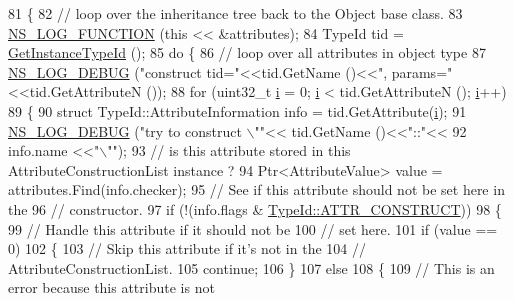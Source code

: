 \begin{DoxyCode}
81 \{
82   \textcolor{comment}{// loop over the inheritance tree back to the Object base class.}
83   \hyperlink{log-macros-disabled_8h_a90b90d5bad1f39cb1b64923ea94c0761}{NS\_LOG\_FUNCTION} (\textcolor{keyword}{this} << &attributes);
84   TypeId tid = \hyperlink{classns3_1_1ObjectBase_abe5b43a6f5b99a92a4c3122db31f06fb}{GetInstanceTypeId} ();
85   \textcolor{keywordflow}{do} \{
86       \textcolor{comment}{// loop over all attributes in object type}
87       \hyperlink{group__logging_ga413f1886406d49f59a6a0a89b77b4d0a}{NS\_LOG\_DEBUG} (\textcolor{stringliteral}{"construct tid="}<<tid.GetName ()<<\textcolor{stringliteral}{", params="}<<tid.GetAttributeN ());
88       \textcolor{keywordflow}{for} (uint32\_t \hyperlink{bernuolliDistribution_8m_a6f6ccfcf58b31cb6412107d9d5281426}{i} = 0; \hyperlink{bernuolliDistribution_8m_a6f6ccfcf58b31cb6412107d9d5281426}{i} < tid.GetAttributeN (); \hyperlink{bernuolliDistribution_8m_a6f6ccfcf58b31cb6412107d9d5281426}{i}++)
89         \{
90           \textcolor{keyword}{struct }TypeId::AttributeInformation info = tid.GetAttribute(\hyperlink{bernuolliDistribution_8m_a6f6ccfcf58b31cb6412107d9d5281426}{i});
91           \hyperlink{group__logging_ga413f1886406d49f59a6a0a89b77b4d0a}{NS\_LOG\_DEBUG} (\textcolor{stringliteral}{"try to construct \(\backslash\)""}<< tid.GetName ()<<\textcolor{stringliteral}{"::"}<<
92                         info.name <<\textcolor{stringliteral}{"\(\backslash\)""});
93           \textcolor{comment}{// is this attribute stored in this AttributeConstructionList instance ?}
94           Ptr<AttributeValue> value = attributes.Find(info.checker);
95           \textcolor{comment}{// See if this attribute should not be set here in the}
96           \textcolor{comment}{// constructor.}
97           \textcolor{keywordflow}{if} (!(info.flags & \hyperlink{classns3_1_1TypeId_a3ab7b43b95f96391c514d609ca60e542aa8dc1d5d889cc9489244c94ede243d62}{TypeId::ATTR\_CONSTRUCT}))
98             \{
99               \textcolor{comment}{// Handle this attribute if it should not be }
100               \textcolor{comment}{// set here.}
101               \textcolor{keywordflow}{if} (value == 0)
102                 \{
103                   \textcolor{comment}{// Skip this attribute if it's not in the}
104                   \textcolor{comment}{// AttributeConstructionList.}
105                   \textcolor{keywordflow}{continue};
106                 \}              
107               \textcolor{keywordflow}{else}
108                 \{
109                   \textcolor{comment}{// This is an error because this attribute is not}

\end{DoxyCode}
